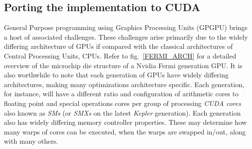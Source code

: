 \subsection{Porting the implementation to CUDA}
General Purpose programming using Graphics Processing Units (GPGPU) brings a host of associated challenges. These challenges arise primarily due to the widely differing architecture of GPUs if compared
with the classical architectures of Central Processing Units, CPUs. Refer to fig.~\ref{FERMI_ARCH} for a detailed overview of the microchip die structure of a Nvidia Fermi generation GPU. It is also worthwhile to note 
that each generation of GPUs have widely differing architectures, making many optimizations architecture specific. Each generation, for instance, will have a different ratio and configuration of arithmetic cores to floating point
and special operations cores per group of processing \textit{CUDA cores} also known as \textit{SMs} (or \textit{SMXs} on the latest \textit{Kepler} generation). Each generation also has widely differing memory 
controller properties. These may determine how many warps of cores can be executed, when the warps are swapped in/out, along with many others. 

